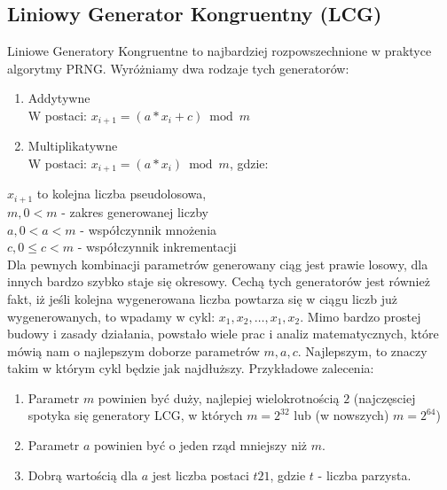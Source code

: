 \documentclass[a4paper, 11pt]{article} %
\begin{document}
\subsection{Liniowy Generator Kongruentny (LCG)}
Liniowe Generatory Kongruentne to najbardziej rozpowszechnione w praktyce algorytmy PRNG. Wyróżniamy dwa rodzaje tych generatorów:
\begin{enumerate}
\item Addytywne\\
W postaci: $x_{i+1}=(a*x_{i}+c) \bmod m$
\item Multiplikatywne\\
W postaci: $x_{i+1} = (a * x_{i}) \bmod m$, gdzie:
\end{enumerate}
$x_{i+1}$ to kolejna liczba pseudolosowa,\\
$m, 0 < m$ - zakres generowanej liczby\\
$a, 0 < a < m$ - współczynnik mnożenia\\
$c, 0 \le c < m$ - współczynnik inkrementacji\\
Dla pewnych kombinacji parametrów generowany ciąg jest prawie losowy, dla innych
bardzo szybko staje się okresowy. Cechą tych generatorów jest również fakt, iż jeśli kolejna wygenerowana liczba powtarza się w ciągu liczb już wygenerowanych, to wpadamy w cykl: $x_{1}, x_{2},\dots,x_{1},x_{2}$. Mimo bardzo prostej budowy i zasady działania, powstało wiele prac i analiz matematycznych, które mówią nam o najlepszym doborze parametrów $m, a, c$. Najlepszym, to znaczy takim w którym cykl będzie jak najdłuższy. Przykładowe zalecenia: \\
\begin{enumerate}
\item Parametr $m$ powinien być duży, najlepiej wielokrotnością $2$ (najczęsciej spotyka się generatory LCG, w których $m = 2^{32}$ lub (w nowszych) $m = 2^{64}$)
\item Parametr $a$ powinien być o jeden rząd mniejszy niż $m$.
\item Dobrą wartością dla $a$ jest liczba postaci $t21$, gdzie $t$ - liczba parzysta.
\end{enumerate}
\end{document}
